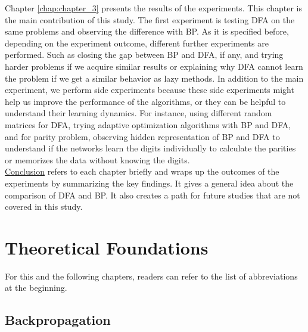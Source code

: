 \documentclass[a4paper, nobind]{templates/ociamthesis}
\begin{document}
Chapter \ref{chap:chapter_3} presents the results of the experiments. This chapter is the main contribution of this study. The first experiment is testing DFA on the same problems and observing the difference with BP. As it is specified before, depending on the experiment outcome, different further experiments are performed. Such as closing the gap between BP and DFA, if any, and trying harder problems if we acquire similar results or explaining why DFA cannot learn the problem if we get a similar behavior as lazy methods. In addition to the main experiment, we perform side experiments because these side experiments might help us improve the performance of the algorithms, or they can be helpful to understand their learning dynamics. For instance, using different random matrices for DFA, trying adaptive optimization algorithms with BP and DFA, and for parity problem, observing hidden representation of BP and DFA to understand if the networks learn the digits individually to calculate the parities or memorizes the data without knowing the digits.\\
\protect\hyperlink{conc}{Conclusion} refers to each chapter briefly and wraps up the outcomes of the experiments by summarizing the key findings. It gives a general idea about the comparison of DFA and BP. It also creates a path for future studies that are not covered in this study.

\hypertarget{chap:chapter_1}{%
\chapter{Theoretical Foundations}\label{chap:chapter_1}}

\minitoc 
\noindent For this and the following chapters, readers can refer to the list of abbreviations at the beginning.

\hypertarget{backpropagation}{%
\section{Backpropagation}\label{backpropagation}}
\end{document}
